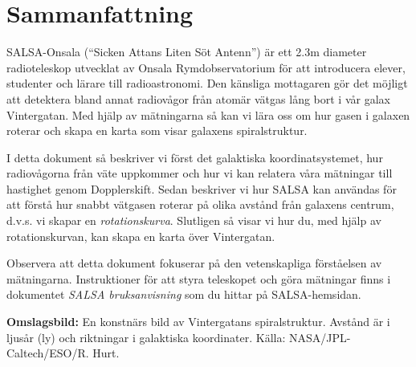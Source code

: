 \chapter*{Sammanfattning}
SALSA-Onsala (``Sicken Attans Liten Söt Antenn'') är ett 2.3m diameter
radioteleskop utvecklat av Onsala Rymdobservatorium för att introducera elever,
studenter och lärare till radioastronomi. Den känsliga mottagaren gör det
möjligt att detektera bland annat radiovågor från atomär vätgas lång bort i vår
galax Vintergatan. Med hjälp av mätningarna så kan vi lära oss om hur gasen i
galaxen roterar och skapa en karta som visar galaxens spiralstruktur.

I detta dokument så beskriver vi först det galaktiska koordinatsystemet, 
hur radiovågorna från väte uppkommer och hur vi kan relatera våra mätningar
till hastighet genom Dopplerskift. Sedan beskriver vi hur SALSA kan användas
för att förstå hur snabbt vätgasen roterar på olika avstånd från galaxens centrum,
d.v.s. vi skapar en \emph{rotationskurva}. Slutligen så visar vi hur du,
med hjälp av rotationskurvan, kan skapa en karta över Vintergatan.

Observera att detta dokument fokuserar på den vetenskapliga förståelsen
av mätningarna. Instruktioner för att styra teleskopet och göra mätningar
finns i dokumentet \emph{SALSA bruksanvisning} som du hittar på SALSA-hemsidan.

\vspace{9cm}




{\bf Omslagsbild:} En konstnärs bild av Vintergatans spiralstruktur. Avstånd
är i ljusår (ly) och riktningar i galaktiska koordinater. Källa:
NASA/JPL-Caltech/ESO/R. Hurt.

